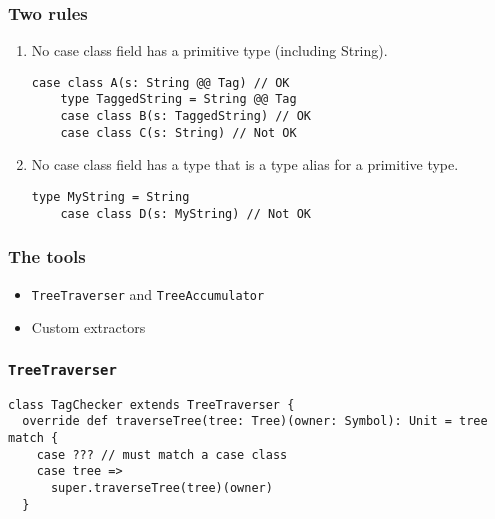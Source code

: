 \documentclass[aspectratio=169]{beamer}
\begin{document}
\begin{frame}[fragile]
  \frametitle{Two rules}
  
  \begin{enumerate}
    \item No case class field has a primitive type (including String).
    \begin{lstlisting}[style=myScalastyle,frame=none]
    case class A(s: String @@ Tag) // OK
    type TaggedString = String @@ Tag
    case class B(s: TaggedString) // OK
    case class C(s: String) // Not OK
    \end{lstlisting}
    \pause
    \item No case class field has a type that is a type alias for a primitive type.
    \begin{lstlisting}[style=myScalastyle,frame=none]
    type MyString = String
    case class D(s: MyString) // Not OK
    \end{lstlisting}
  \end{enumerate}
\end{frame}

\begin{frame}
  \frametitle{The tools}
  
  \begin{itemize}
    \item \texttt{TreeTraverser} and \texttt{TreeAccumulator}
    \item Custom extractors
  \end{itemize}
\end{frame}

\begin{frame}[fragile]
  \frametitle{\texttt{TreeTraverser}}
  \begin{lstlisting}[style=myScalastyle,frame=none]
class TagChecker extends TreeTraverser {
  override def traverseTree(tree: Tree)(owner: Symbol): Unit = tree match {
    case ??? // must match a case class
    case tree =>
      super.traverseTree(tree)(owner)
  }
\end{lstlisting}
  
\end{frame}
\end{document}

